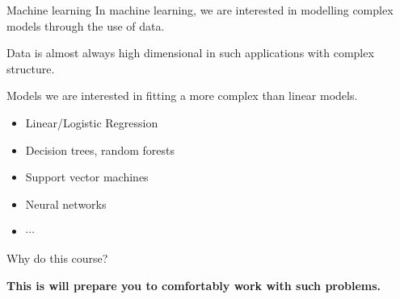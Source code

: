 \documentclass[aspectratio=169]{beamer}
\let\olditem\item
\renewcommand{\item}{\setlength{\itemsep}{\fill}\olditem}
\begin{document}
\begin{frame}{Machine learning}
  In machine learning, we are interested in modelling complex models through the use of data.
  \vspace{0.5cm}
  
  Data is almost always high dimensional in such applications with complex structure.
  \vspace{0.5cm}
  
  Models we are interested in fitting a more complex than linear models.
  \begin{itemize}
    \item Linear/Logistic Regression
    \item Decision trees, random forests
    \item Support vector machines
    \item Neural networks
    \item $\cdots$
  \end{itemize}
\end{frame}


\begin{frame}{Why do this course?}
  \begin{center}
    \textcolor{myred}{\huge \textbf{This is will prepare you to comfortably work with such problems.}}
  \end{center}
\end{frame}
\end{document}
